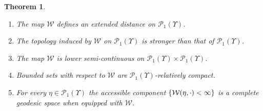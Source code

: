 \documentclass[JEP,XML,SOM,Unicode,published]{cedram}
\newtheorem{theorem}{Theorem}[section]
\theoremstyle{definition}
\theoremstyle{remark}
\DeclarePairedDelimiter{\set}{\lbrace}{\rbrace}
\begin{document}
\begin{theorem}\label{t:W}
\begin{enumerate}[$(\rm i)$, wide]
\item\label{i:W-extended-distance} The map $\mathcal{W}$ defines an extended distance on $\mathscr{P}_{1}(\varUpsilon)$.
\item\label{i:W-topology} The topology induced by $\mathcal{W}$ on $\mathscr{P}_{1}(\varUpsilon)$ is stronger than that of $\mathscr{P}_{1}(\varUpsilon)$.
\item\label{i:W-lsc} The map $\mathcal{W}$ is lower semi-continuous on $\mathscr{P}_{1}(\varUpsilon) \times \mathscr{P}_{1}(\varUpsilon)$.
\item\label{i:W-bounded} Bounded sets with respect to $\mathcal{W}$ are $\mathscr{P}_{1}(\varUpsilon)$-relatively compact.
\item\label{i:W-complete-geodesic} For every $\eta \in \mathscr{P}_{1}(\varUpsilon)$ the accessible component $\set*{ \mathcal{W}(\eta, \cdot) < \infty }$ is a complete geodesic space when equipped with $\mathcal{W}$.
\end{enumerate}
\end{theorem}
\end{document}
